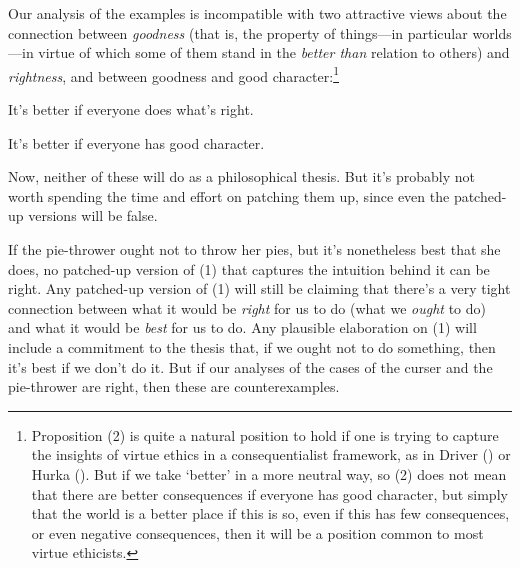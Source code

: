 \documentclass[
  11pt,
  letterpaper,
  DIV=11,
  numbers=noendperiod,
  twoside]{scrartcl}
\providecommand{\tightlist}{%
  \setlength{\itemsep}{0pt}\setlength{\parskip}{0pt}}
\begin{document}
Our analysis of the examples is incompatible with two attractive views
about the connection between \emph{goodness} (that is, the property of
things---in particular worlds---in virtue of which some of them stand in
the \emph{better than} relation to others) and \emph{rightness}, and
between goodness and good character:\footnote{Proposition (2) is quite a
  natural position to hold if one is trying to capture the insights of
  virtue ethics in a consequentialist framework, as in Driver
  () or Hurka
  (). But if we take `better' in a more
  neutral way, so (2) does not mean that there are better consequences
  if everyone has good character, but simply that the world is a better
  place if this is so, even if this has few consequences, or even
  negative consequences, then it will be a position common to most
  virtue ethicists.}

\begin{description}
\tightlist
\item[(1)]
It's better if everyone does what's right.
\item[(2)]
It's better if everyone has good character.
\end{description}

Now, neither of these will do as a philosophical thesis. But it's
probably not worth spending the time and effort on patching them up,
since even the patched-up versions will be false.

If the pie-thrower ought not to throw her pies, but it's nonetheless
best that she does, no patched-up version of (1) that captures the
intuition behind it can be right. Any patched-up version of (1) will
still be claiming that there's a very tight connection between what it
would be \emph{right} for us to do (what we \emph{ought} to do) and what
it would be \emph{best} for us to do. Any plausible elaboration on (1)
will include a commitment to the thesis that, if we ought not to do
something, then it's best if we don't do it. But if our analyses of the
cases of the curser and the pie-thrower are right, then these are
counterexamples.
\end{document}
